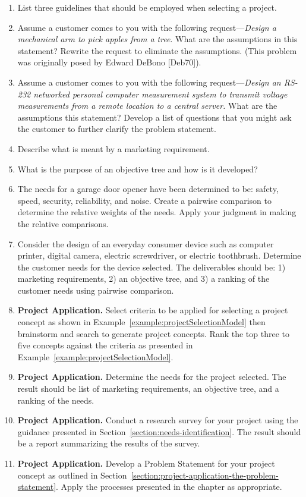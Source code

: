 \begin{enumerate}
\item
  List three guidelines that should be employed when selecting a
  project.
\item
  Assume a customer comes to you with the following
  request---\emph{Design a mechanical arm to pick apples from a tree}.
  What are the assumptions in this statement? Rewrite the request to
  eliminate the assumptions. (This problem was originally posed by
  Edward DeBono {[}Deb70{]}).
\item
  Assume a customer comes to you with the following
  request---\emph{Design an RS-232 networked personal computer
  measurement system to transmit voltage measurements from a remote
  location to a central server.} What are the assumptions this
  statement? Develop a list of questions that you might ask the customer
  to further clarify the problem statement.
\item
  Describe what is meant by a marketing requirement.
\item
  What is the purpose of an objective tree and how is it developed?
\item
  The needs for a garage door opener have been determined to be: safety,
  speed, security, reliability, and noise. Create a pairwise comparison
  to determine the relative weights of the needs. Apply your judgment in
  making the relative comparisons.
\item
  Consider the design of an everyday consumer device such as computer
  printer, digital camera, electric screwdriver, or electric toothbrush.
  Determine the customer needs for the device selected. The deliverables
  should be: 1) marketing requirements, 2) an objective tree, and 3) a
  ranking of the customer needs using pairwise comparison.
\item
  \textbf{Project Application.} Select criteria to be applied for
  selecting a project concept as shown in Example~\ref{example:projectSelectionModel}
  then brainstorm and search to generate project concepts. Rank the top three to five
  concepts against the criteria as presented in Example~\ref{example:projectSelectionModel}.
\item
  \textbf{Project Application.} Determine the needs for the project
  selected. The result should be list of marketing requirements, an
  objective tree, and a ranking of the needs.
\item
  \textbf{Project Application.} Conduct a research survey for your
  project using the guidance presented in Section~\ref{section:needs-identification}. The result should
  be a report summarizing the results of the survey.
\item
  \textbf{Project Application.} Develop a Problem Statement for your
  project concept as outlined in Section~\ref{section:project-application-the-problem-statement}. 
  Apply the processes
  presented in the chapter as appropriate.
\end{enumerate}
